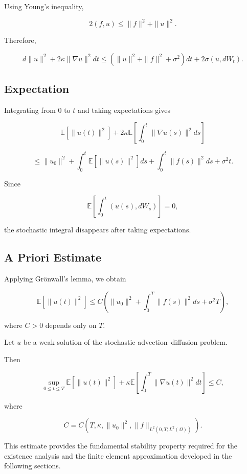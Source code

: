Using Young's inequality,

\[
2(f,u)
\le
\|f\|^2
+
\|u\|^2.
\]

Therefore,

\[
d\|u\|^2
+
2\kappa
\|\nabla u\|^2dt
\le
\left(
\|u\|^2
+
\|f\|^2
+
\sigma^2
\right)dt
+
2\sigma(u,dW_t).
\]

\subsection{Expectation}

Integrating from $0$ to $t$ and taking expectations gives

\[
\mathbb E[\|u(t)\|^2]
+
2\kappa
\mathbb E
\left[
\int_0^t
\|\nabla u(s)\|^2 ds
\right]
\]

\[
\le
\|u_0\|^2
+
\int_0^t
\mathbb E[\|u(s)\|^2]ds
+
\int_0^t
\|f(s)\|^2 ds
+
\sigma^2 t.
\]

Since

\[
\mathbb E
\left[
\int_0^t
(u(s),dW_s)
\right]
=
0,
\]

the stochastic integral disappears after taking expectations.

\subsection{A Priori Estimate}

Applying Grönwall's lemma, we obtain

\[
\mathbb E[\|u(t)\|^2]
\le
C
\left(
\|u_0\|^2
+
\int_0^T
\|f(s)\|^2 ds
+
\sigma^2T
\right),
\]

where $C>0$ depends only on $T$.

\begin{theorem}
Let $u$ be a weak solution of the stochastic advection--diffusion problem.

Then

\[
\sup_{0\le t\le T}
\mathbb E[\|u(t)\|^2]
+
\kappa
\mathbb E
\left[
\int_0^T
\|\nabla u(t)\|^2dt
\right]
\le
C,
\]

where

\[
C=
C
\left(
T,
\kappa,
\|u_0\|^2,
\|f\|_{L^2(0,T;L^2(\Omega))}
\right).
\]

\end{theorem}

This estimate provides the fundamental stability 
property required for the existence analysis and the 
finite element approximation developed in the following sections.